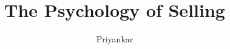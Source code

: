 \documentclass{notestyle}
\title{The Psychology of Selling}
\author{Priyankar}
\begin{document}
\maketitle
\tableofcontents
\clearpage










\nocite{*}
\end{document}
